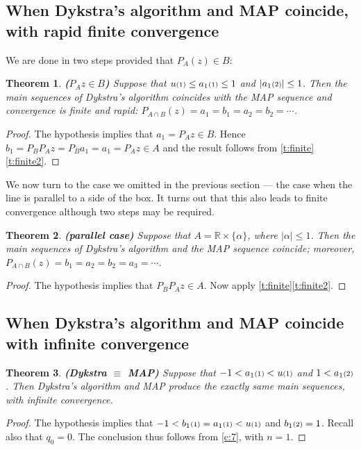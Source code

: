\documentclass[12pt]{article}
\newcommand{\RR}{\ensuremath{\mathbb R}}
\newtheorem{theorem}{Theorem}[section]
\providecommand{\RR}{\mathbb{R}}
\providecommand{\RR}{\mathbb{R}}
\newcommand{\eins}{\ensuremath{\textstyle\mathsmaller{({1})}}}
\newcommand{\zwei}{\ensuremath{\textstyle\mathsmaller{({2})}}}
\begin{document}
\subsection*{When Dykstra's algorithm and MAP coincide, 
with rapid finite convergence}
We are done in two steps  provided that $P_A(z)\in B$: 

\begin{theorem} {\rm\bf (${P_Az\in B}$)}
Suppose that $u\eins\leq a_1\eins\leq 1$ and $|a_1\zwei|\leq 1$. 
Then the main sequences of Dykstra's algorithm coincides with 
the MAP sequence and convergence is finite and rapid:
$P_{A\cap B}(z) = a_1=b_1=a_2=b_2=\cdots$.
\end{theorem}
\begin{proof}
The hypothesis implies that $a_1=P_Az\in B$.
Hence $b_1 = P_BP_Az=P_Ba_1 = a_1 = P_Az\in A$ and the result
follows from \cref{t:finite}\cref{t:finite2}.
\end{proof}

We now turn to the case we omitted in the previous section 
--- the case when the line is parallel to a side of the box. 
It turns out that this also leads to 
finite convergence although two steps may be required. 

\begin{theorem} {\rm\bf (parallel case)}
Suppose that $A = \RR\times\{\alpha\}$, where $|\alpha|\leq 1$.
Then the main sequences of Dykstra's algorithm  and the MAP sequence
coincide; moreover, 
$P_{A\cap B}(z) = b_1=a_2=b_2=a_3=\cdots$.
\end{theorem}
\begin{proof}
The hypothesis implies that $P_BP_Az\in A$.
Now apply \cref{t:finite}\cref{t:finite2}.
\end{proof}


\subsection*{When Dykstra's algorithm and MAP coincide with infinite convergence}


\begin{theorem} {\rm\bf (Dykstra $\equiv$ MAP)}
  \label{t:hard}
Suppose that $-1<a_1\eins<u\eins$ and $1 < a_1\zwei$.
Then Dykstra's algorithm and MAP produce the exactly same main sequences,
with infinite convergence. 
\end{theorem}
\begin{proof}
The hypothesis implies that $-1<b_1\eins = a_1\eins<u\eins$ and
$b_1\zwei=1$. Recall also that $q_0=0$. 
The conclusion thus follows from \cref{c:7}, with $n=1$.
\end{proof}
\end{document}

